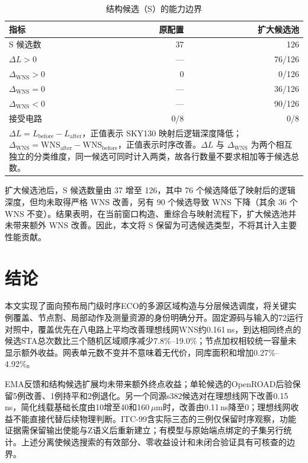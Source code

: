 \documentclass[twocolumn,10pt,fontset=windows]{ctexart}
\begin{document}
\begin{table}[H]
\centering
\caption{结构候选（S）的能力边界}
\label{tab:s_boundary}
\footnotesize
\setlength{\tabcolsep}{8pt}
\begin{tabular}{lrr}
\toprule
\textbf{指标} & \textbf{原配置} & \textbf{扩大候选池} \\
\midrule
S 候选数 & 37 & 126 \\
$\Delta L>0$ & — & 76/126 \\
$\Delta_{\mathrm{WNS}}>0$ & 0 & 0/126 \\
$\Delta_{\mathrm{WNS}}=0$ & — & 36/126 \\
$\Delta_{\mathrm{WNS}}<0$ & — & 90/126 \\
接受电路 & 0/8 & 0/8 \\
\bottomrule
\multicolumn{3}{p{0.9\columnwidth}}{\footnotesize $\Delta L=L_{\mathrm{before}}-L_{\mathrm{after}}$，正值表示 SKY130 映射后逻辑深度降低；$\Delta_{\mathrm{WNS}}=\mathrm{WNS}_{\mathrm{after}}-\mathrm{WNS}_{\mathrm{before}}$，正值表示时序改善。$\Delta L$ 与 $\Delta_{\mathrm{WNS}}$ 为两个相互独立的分类维度，同一候选可同时计入两类，故各行数量不要求相加等于候选总数。}\\
\end{tabular}
\end{table}



扩大候选池后，S 候选数量由 37 增至 126，其中 76 个候选降低了映射后的逻辑深度，但均未取得严格 WNS 改善，另有 90 个候选导致 WNS 下降（其余 36 个 WNS 不变）。结果表明，在当前窗口构造、重综合与映射流程下，扩大候选池并未带来额外 WNS 改善。因此，本文将 S 保留为可选候选类型，不将其计入主要性能贡献。

\section{结论}\label{sec:conclusion}

本文实现了面向预布局门级时序ECO的多源区域构造与分层候选调度，将关键实例覆盖、节点割、局部动作及测量资源的身份明确分开。固定源码与输入的72运行对照中，覆盖优先在八电路上平均改善理想线网WNS约0.161\,ns，到达相同终点的候选STA总次数比三个随机区域顺序减少7.8\%--19.0\%；节点加权相较统一容量未显示额外收益。网表单元数不变并不意味着无代价，同库面积和增加0.27\%--4.92\%。

EMA反馈和结构候选扩展均未带来额外终点收益；单轮候选的OpenROAD后验保留5例改善、1例持平和2例退化。另一个同源s382候选对在理想线网下改善0.15\,ns，简化线载基础长度由10增至40和160\,$\mu$m时，改善由0.11\,ns降至0；理想线网收益不能直接代替后续物理判断。ITC-99含实际三态的三例仅保留时序观察，功能证据需保留输出使能与Z语义后重新建立；有模型与原始端点绑定的子集另行统计。上述分离使候选搜索的有效部分、零收益设计和未闭合验证具有可核查的边界。
\end{document}
